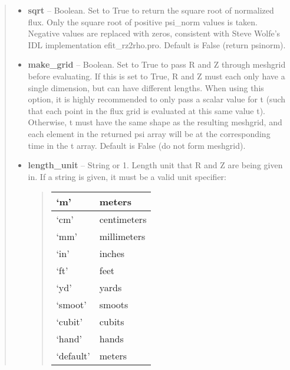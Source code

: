 \documentclass[letterpaper,10pt,english]{sphinxmanual}
\begin{document}
\begin{fulllineitems}
\begin{fulllineitems}
\begin{quote}
\begin{description}
\begin{itemize}
\item {} 
\textbf{sqrt} --
Boolean. Set to True to return the square root of normalized
flux. Only the square root of positive psi\_norm values is taken.
Negative values are replaced with zeros, consistent with Steve
Wolfe's IDL implementation efit\_rz2rho.pro. Default is False
(return psinorm).

\item {} 
\textbf{make\_grid} --
Boolean. Set to True to pass R and Z through meshgrid
before evaluating. If this is set to True, R and Z must each
only have a single dimension, but can have different lengths.
When using this option, it is highly recommended to only pass
a scalar value for t (such that each point in the flux grid is
evaluated at this same value t). Otherwise, t must have the
same shape as the resulting meshgrid, and each element in the
returned psi array will be at the corresponding time in the t
array. Default is False (do not form meshgrid).

\item {} 
\textbf{length\_unit} --
String or 1. Length unit that R and Z are being given
in. If a string is given, it must be a valid unit specifier:
\begin{quote}

\begin{tabulary}{\linewidth}{|L|L|}
\hline

`m'
 & 
meters
\\\hline

`cm'
 & 
centimeters
\\\hline

`mm'
 & 
millimeters
\\\hline

`in'
 & 
inches
\\\hline

`ft'
 & 
feet
\\\hline

`yd'
 & 
yards
\\\hline

`smoot'
 & 
smoots
\\\hline

`cubit'
 & 
cubits
\\\hline

`hand'
 & 
hands
\\\hline

`default'
 & 
meters
\\\hline
\end{tabulary}

\end{quote}


\end{itemize}
\end{description}
\end{quote}
\end{fulllineitems}
\end{fulllineitems}
\end{document}
